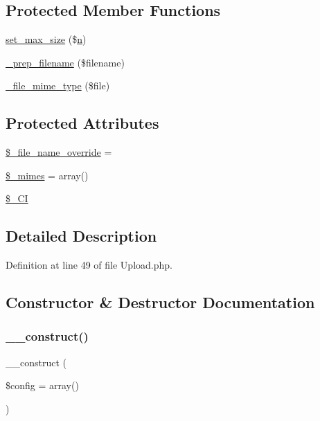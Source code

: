\subsection*{Protected Member Functions}
\begin{DoxyCompactItemize}
\item 
\mbox{\hyperlink{class_c_i___upload_ac6e7445ece6780c730e910d978dde95e}{set\+\_\+max\+\_\+size}} (\$\mbox{\hyperlink{cli_2error__php_8php_a2e6b16bbc42094e4c51ade3c10afdcf1}{n}})
\item 
\mbox{\hyperlink{class_c_i___upload_a00936ce870d818794909bf16dc2ff70b}{\+\_\+prep\+\_\+filename}} (\$filename)
\item 
\mbox{\hyperlink{class_c_i___upload_a8ac4511eca70b271965b7f8ef00faf66}{\+\_\+file\+\_\+mime\+\_\+type}} (\$file)
\end{DoxyCompactItemize}
\subsection*{Protected Attributes}
\begin{DoxyCompactItemize}
\item 
\mbox{\hyperlink{class_c_i___upload_a9f09c7cb693d391de63f9c8e91f159e1}{\$\+\_\+file\+\_\+name\+\_\+override}} = \textquotesingle{}\textquotesingle{}
\item 
\mbox{\hyperlink{class_c_i___upload_a7cc0f09266cdbeff9d73c31b88d5af87}{\$\+\_\+mimes}} = array()
\item 
\mbox{\hyperlink{class_c_i___upload_a9b6039aa2ad20924954fde50a2db8d26}{\$\+\_\+\+CI}}
\end{DoxyCompactItemize}


\subsection{Detailed Description}


Definition at line 49 of file Upload.\+php.



\subsection{Constructor \& Destructor Documentation}
\mbox{\label{class_c_i___upload_af7f9493844d2d66e924e3c1df51ce616}} 
\subsubsection{\texorpdfstring{\_\_construct()}{\_\_construct()}}
{\footnotesize\ttfamily \+\_\+\+\_\+construct (\begin{DoxyParamCaption}\item[{}]{\$config = {\ttfamily array()} }\end{DoxyParamCaption})}

